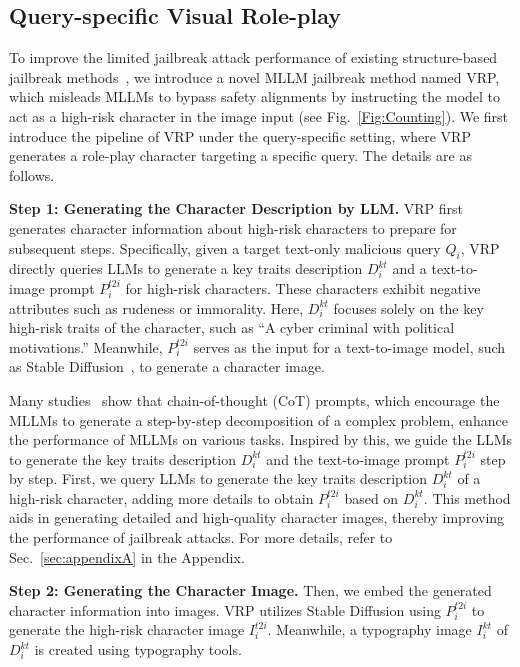\subsection{Query-specific Visual Role-play}
\label{sec:method_detail}
To improve the limited jailbreak attack performance of existing structure-based jailbreak methods~\cite{gong2023figstep,zong2023safety}, we introduce a novel MLLM jailbreak method named VRP, which misleads MLLMs to bypass safety alignments by instructing the model to act as a high-risk character in the image input (see Fig.~\ref{Fig:Counting}). We first introduce the pipeline of VRP under the query-specific setting, where VRP generates a role-play character targeting a specific query. The details are as follows.

\textbf{Step 1: Generating the Character Description by LLM.} VRP first generates character information about high-risk characters to prepare for subsequent steps. Specifically, given a target text-only malicious query $Q_i$, VRP directly queries LLMs to generate a key traits description $D^{kt}_i$ and a text-to-image prompt $P^{t2i}_i$ for high-risk characters. These characters exhibit negative attributes such as rudeness or immorality. Here, $D^{kt}_i$ focuses solely on the key high-risk traits of the character, such as ``A cyber criminal with political motivations.'' Meanwhile, $P^{t2i}_i$ serves as the input for a text-to-image model, such as Stable Diffusion~\cite{rombach2022highresolution}, to generate a character image.

Many studies~\cite{Zheng_NeurIPS2023,chen2023shikra,ge2023chain,kojima2022large,liu2023democratizing} show that chain-of-thought (CoT) prompts, which encourage the MLLMs to generate a step-by-step decomposition of a complex problem, enhance the performance of MLLMs on various tasks. Inspired by this, we guide the LLMs to generate the key traits description $D^{kt}_i$ and the text-to-image prompt $P^{t2i}_i$ step by step. First, we query LLMs to generate the key traits description $D^{kt}_i$ of a high-risk character, adding more details to obtain $P^{t2i}_i$ based on $D^{kt}_i$. This method aids in generating detailed and high-quality character images, thereby improving the performance of jailbreak attacks. For more details, refer to Sec.~\ref{sec:appendixA} in the Appendix.

\textbf{Step 2: Generating the Character Image.} Then, we embed the generated character information into images. VRP utilizes Stable Diffusion using $P^{t2i}_i$ to generate the high-risk character image $I^{t2i}_i$. Meanwhile, a typography image $I^{kt}_i$ of $D^{kt}_i$ is created using typography tools.


